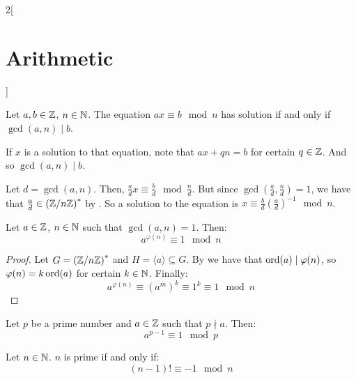 \documentclass[../../../main_math.tex]{subfiles}
\begin{document}
\begin{multicols}{2}[\section{Arithmetic}]
\begin{proposition}
    Let $a,b\in\mathbb{Z}$, $n\in\mathbb{N}$. The equation $ax\equiv b\mod n$ has solution if and only if $\gcd(a,n)\mid b$.
  \end{proposition}
  \begin{sproof}
    \begin{itemizeiff}
      If $x$ is a solution to that equation, note that $ax+qn=b$ for certain $q\in\mathbb{Z}$. And so $\gcd(a,n)\mid b$.
      \item Let $d=\gcd(a,n)$. Then, $\frac{a}{d}x\equiv \frac{b}{d}\mod \frac{n}{d}$. But since $\gcd\left(\frac{a}{d},\frac{n}{d}\right)=1$, we have that $\frac{a}{d}\in {\left(\quot{\ZZ}{n\ZZ}\right)}^*$ by . So a solution to the equation is $x\equiv \frac{b}{d}{\left(\frac{a}{d}\right)}^{-1}\mod n$.
    \end{itemizeiff}
  \end{sproof}
  \begin{theorem}
    Let $a\in\mathbb{Z}$, $n\in\mathbb{N}$ such that $\gcd(a, n)=1$. Then: $$a^{\varphi(n)}\equiv 1\mod n$$
  \end{theorem}
  \begin{proof}
    Let $G={\left(\quot{\ZZ}{n\ZZ}\right)}^*$ and $H=\langle a\rangle\subseteq G$. By  we have that $\operatorname{ord}(a)\mid \varphi(n)$, so $\varphi(n)=k\operatorname{ord}(a)$ for certain $k\in\mathbb{N}$. Finally: $$a^{\varphi(n)}\equiv{(a^m)}^k\equiv 1^k\equiv 1\mod n$$
  \end{proof}
  \begin{corollary}
    Let $p$ be a prime number and $a\in\mathbb{Z}$ such that $p\nmid a$. Then: $$a^{p-1}\equiv 1\mod p$$
  \end{corollary}
  \begin{theorem}
    Let $n\in\mathbb{N}$. $n$ is prime if and only if: $$(n-1)!\equiv -1\mod n$$
  \end{theorem}
\end{multicols}
\end{document}
